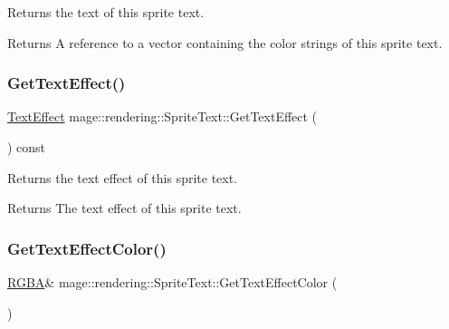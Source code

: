 Returns the text of this sprite text.

\begin{DoxyReturn}{Returns}
A reference to a vector containing the color strings of this sprite text. 
\end{DoxyReturn}
\hypertarget{classmage_1_1rendering_1_1_sprite_text_a7c61e9d50bb6c3c46507706e1aad8d5c}{}\label{classmage_1_1rendering_1_1_sprite_text_a7c61e9d50bb6c3c46507706e1aad8d5c} 
\subsubsection{\texorpdfstring{Get\+Text\+Effect()}{GetTextEffect()}}
{\footnotesize\ttfamily \hyperlink{classmage_1_1rendering_1_1_sprite_text_af07ecf28d2ab8997c011cab74e799ef7}{Text\+Effect} mage\+::rendering\+::\+Sprite\+Text\+::\+Get\+Text\+Effect (\begin{DoxyParamCaption}{ }\end{DoxyParamCaption}) const\hspace{0.3cm}{\ttfamily [noexcept]}}

Returns the text effect of this sprite text.

\begin{DoxyReturn}{Returns}
The text effect of this sprite text. 
\end{DoxyReturn}
\hypertarget{classmage_1_1rendering_1_1_sprite_text_aa5cd1f28efdf8508474dd962e8733783}{}\label{classmage_1_1rendering_1_1_sprite_text_aa5cd1f28efdf8508474dd962e8733783} 
\subsubsection{\texorpdfstring{Get\+Text\+Effect\+Color()}{GetTextEffectColor()}\hspace{0.1cm}{\footnotesize\ttfamily [1/2]}}
{\footnotesize\ttfamily \hyperlink{structmage_1_1_r_g_b_a}{R\+G\+BA}\& mage\+::rendering\+::\+Sprite\+Text\+::\+Get\+Text\+Effect\+Color (\begin{DoxyParamCaption}{ }\end{DoxyParamCaption})\hspace{0.3cm}{\ttfamily [noexcept]}}

